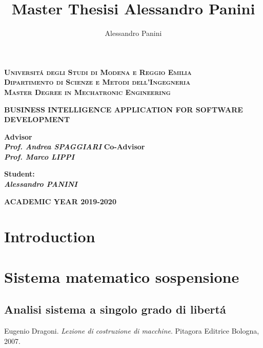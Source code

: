 \documentclass[a4paper,12pt,twoside]{report}
\title{\textbf{Master Thesisi Alessandro Panini}}
\date{}
\author{Alessandro Panini}
\newlength{\drop}%
\newcommand*{\titleSal}%
{
	\begin{center}  
		\begingroup
		{\Large\bfseries\rmfamily\scshape Universit\'a degli Studi di Modena e Reggio Emilia}\\
		{\Large\bfseries\rmfamily\scshape Dipartimento di Scienze e Metodi dell'Ingegneria }\\[\baselineskip]
		\vspace*{1cm}
		\vspace*{\drop}
		{\Large\bfseries\rmfamily\scshape Master Degree in Mechatronic Engineering}\\[\baselineskip]
		\vspace*{\drop}
		
		\vspace*{3cm}
		
		\linespread{3}
		{\LARGE\bfseries\rmfamily BUSINESS INTELLIGENCE APPLICATION FOR SOFTWARE DEVELOPMENT}\\
		\vspace*{4cm}
		
	\end{center}
	\vspace*{2cm}   
	\begin{minipage}{0.5\textwidth}
		\begin{flushleft}
			{\small\bfseries Advisor}\\
			{\bfseries\itshape Prof. Andrea SPAGGIARI }
			{\small\bfseries Co-Advisor}\\
			{\bfseries\itshape Prof. Marco LIPPI }
		\end{flushleft}
	\end{minipage}
	\begin{minipage}{0.4\textwidth}
		\begin{flushright} 
		    \vspace{\baselineskip}
		    \vspace{\baselineskip}
			{\bfseries\small Student:}\\
			{\bfseries\itshape Alessandro PANINI}
		\end{flushright}
	\end{minipage}  
	\vfill
	
	{\large\bfseries\rmfamily ACADEMIC YEAR 2019-2020}
	
	\endgroup
}
\begin{document}
	
\titleSal
\pagestyle{plain}

\newcommand*\rot{\multicolumn{1}{R{45}{1em}}}

	
	\newpage
	
	
	\tableofcontents
	
\chapter*{Introduction}


	
		
		
\cleardoublepage
\chapter{Sistema matematico sospensione}
\section{Analisi sistema a singolo grado di libert\'a}

\begin{thebibliography}{9}
	
	Eugenio Dragoni. 
	\textit{Lezione di costruzione di macchine}.
	Pitagora Editrice Bologna, 2007.
	
\end{thebibliography}
\end{document}
